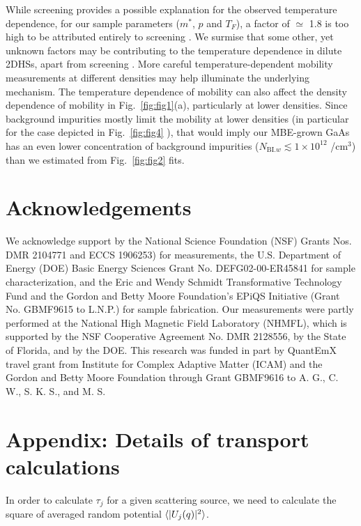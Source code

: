 \documentclass[reprint,amsmath,amssymb,aps,prl,nobibnotes,superscriptaddress]{revtex4-1}
\begin{document}
While screening provides a possible explanation for the observed temperature dependence, for our sample parameters ($m^*$, $p$ and $T_F$), a factor of $\simeq$ 1.8 is too high to be attributed entirely to screening \cite{Sarma2015,footnote3}. We surmise that some other, yet unknown factors may be contributing to the temperature dependence in dilute 2DHSs, apart from screening \cite{footnote3}. More careful temperature-dependent mobility measurements at different densities may help illuminate the underlying mechanism. The temperature dependence of mobility can also affect the density dependence of mobility in Fig.~\ref{fig:fig1}(a), particularly at lower densities. Since background impurities mostly limit the mobility at lower densities (in particular for the case depicted in Fig.~\ref{fig:fig4} \cite{Supp}), that would imply our MBE-grown GaAs has an even lower concentration of background impurities ($N_{\textrm{BI.}w} \lesssim 1\times10^{12}$ /cm$^{3}$) than we estimated from Fig.~\ref{fig:fig2} fits.

\section*{Acknowledgements}
We acknowledge support by the National Science Foundation (NSF) Grants Nos. DMR 2104771 and ECCS 1906253) for measurements, the U.S. Department of Energy (DOE) Basic Energy Sciences Grant No. DEFG02-00-ER45841 for sample characterization, and the Eric and Wendy Schmidt Transformative Technology Fund and the Gordon and Betty Moore Foundation’s EPiQS Initiative (Grant No. GBMF9615 to L.N.P.) for sample fabrication. Our measurements were partly performed at the National High Magnetic Field Laboratory (NHMFL), which is supported by the NSF Cooperative Agreement No. DMR 2128556, by the State of Florida, and by the DOE. This research was funded in part by QuantEmX travel grant from Institute for Complex Adaptive Matter (ICAM) and the Gordon and Betty Moore Foundation through Grant GBMF9616 to A. G., C. W., S. K. S., and M. S.

\appendix
\section*{Appendix: Details of transport calculations}
\setcounter{equation}{0}
\renewcommand{\theequation}{A\arabic{equation}}
In order to calculate $\tau_j$ for a given scattering source, we need to calculate the square of averaged random potential $\braket{|U_j(q)|^2}$.
\end{document}

